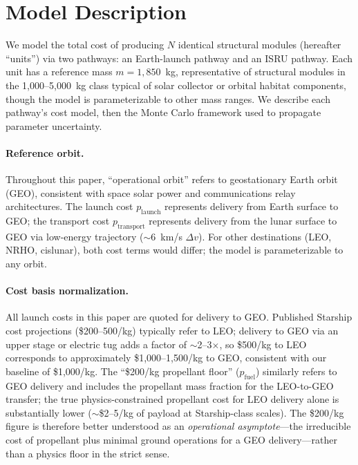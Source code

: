 \documentclass[preprint,12pt]{elsarticle}
\begin{document}
\section{Model Description}
\label{sec:model}

We model the total cost of producing $N$ identical structural modules (hereafter ``units'') via two pathways: an Earth-launch pathway and an ISRU pathway. Each unit has a reference mass $m = 1{,}850$~kg, representative of structural modules in the 1{,}000--5{,}000~kg class typical of solar collector or orbital habitat components, though the model is parameterizable to other mass ranges. We describe each pathway's cost model, then the Monte Carlo framework used to propagate parameter uncertainty.

\paragraph{Reference orbit.} Throughout this paper, ``operational orbit'' refers to geostationary Earth orbit (GEO), consistent with space solar power and communications relay architectures. The launch cost $p_{\mathrm{launch}}$ represents delivery from Earth surface to GEO; the transport cost $p_{\mathrm{transport}}$ represents delivery from the lunar surface to GEO via low-energy trajectory ($\sim$6~km/s $\Delta v$). For other destinations (LEO, NRHO, cislunar), both cost terms would differ; the model is parameterizable to any orbit.

\paragraph{Cost basis normalization.} All launch costs in this paper are quoted for delivery to GEO. Published Starship cost projections (\$200--500/kg) typically refer to LEO; delivery to GEO via an upper stage or electric tug adds a factor of $\sim$2--3$\times$, so \$500/kg to LEO corresponds to approximately \$1,000--1,500/kg to GEO, consistent with our baseline of \$1,000/kg. The ``\$200/kg propellant floor'' ($p_{\mathrm{fuel}}$) similarly refers to GEO delivery and includes the propellant mass fraction for the LEO-to-GEO transfer; the true physics-constrained propellant cost for LEO delivery alone is substantially lower ($\sim$\$2--5/kg of payload at Starship-class scales). The \$200/kg figure is therefore better understood as an \emph{operational asymptote}---the irreducible cost of propellant plus minimal ground operations for a GEO delivery---rather than a physics floor in the strict sense.
\end{document}
